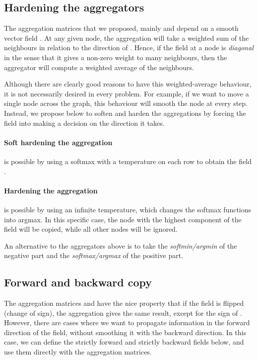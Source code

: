 \documentclass{article} \usepackage{arxiv,times}
\begin{document}
\subsection{Hardening the aggregators}
\label{app:agg:hardening}

The aggregation matrices that we proposed, mainly  and  depend on a smooth vector field . At any given node, the aggregation will take a weighted sum of the neighbours in relation to the direction of . Hence, if the field  at a node  is \textit{diagonal} in the sense that it gives a non-zero weight to many neighbours, then the aggregator will compute a weighted average of the neighbours. 

Although there are clearly good reasons to have this weighted-average behaviour, it is not necessarily desired in every problem. For example, if we want to move a single node across the graph, this behaviour will smooth the node at every step. Instead, we propose below to soften and harden the aggregations by forcing the field into making a decision on the direction it takes.

\paragraph{Soft hardening the aggregation} is possible by using a softmax with a temperature  on each row to obtain the field .


\paragraph{Hardening the aggregation} is possible by using an infinite temperature, which changes the softmax functions into argmax. In this specific case, the node with the highest component of the field will be copied, while all other nodes will be ignored.



An alternative to the aggregators above is to take the \textit{softmin/argmin} of the negative part and the \textit{softmax/argmax} of the positive part.

\subsection{Forward and backward copy}

The aggregation matrices  and  have the nice property that if the field is flipped (change of sign), the aggregation gives the same result, except for the sign of . However, there are cases where we want to propagate information in the forward direction of the field, without smoothing it with the backward direction. In this case, we can define the strictly forward and strictly backward fields below, and use them directly with the aggregation matrices.
\end{document}
